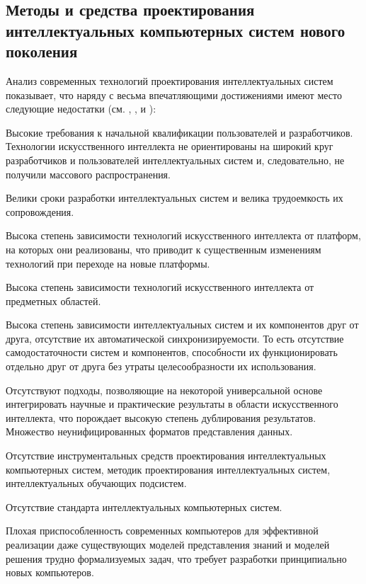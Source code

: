 
\begin{partbacktext}
\part{Методы и средства проектирования интеллектуальных компьютерных систем нового поколения}
\noindent
Анализ современных технологий проектирования интеллектуальных систем показывает, что
наряду с весьма впечатляющими достижениями имеют место следующие недостатки (см. , ,  и ):
\begin{textitemize}
	\item{Высокие требования к начальной квалификации пользователей и разработчиков. Технологии искусственного интеллекта не ориентированы на широкий круг разработчиков и пользователей интеллектуальных систем и, следовательно, не получили массового распространения.}
	\item{Велики сроки разработки интеллектуальных систем и велика трудоемкость их сопровождения.}
	\item{Высока степень зависимости технологий искусственного интеллекта от платформ, на которых они реализованы, что приводит к существенным изменениям технологий при переходе на новые платформы.}
	\item{Высока степень зависимости технологий искусственного интеллекта от предметных областей.}
	\item{Высока степень зависимости интеллектуальных систем и их компонентов друг от друга, отсутствие их автоматической синхронизируемости. То есть отсутствие самодостаточности систем и компонентов, способности их функционировать отдельно друг от друга без утраты целесообразности их использования.}
	\item{Отсутствуют подходы, позволяющие на некоторой универсальной основе интегрировать научные и практические результаты в области искусственного интеллекта, что порождает высокую степень дублирования результатов. Множество неунифицированных форматов представления данных.}
	\item{Отсутствие инструментальных средств проектирования интеллектуальных компьютерных систем, методик проектирования интеллектуальных систем, интеллектуальных обучающих подсистем.}
	\item{Отсутствие стандарта интеллектуальных компьютерных систем.}
	\item{Плохая приспособленность современных компьютеров для эффективной реализации даже существующих моделей представления знаний и моделей решения трудно формализуемых задач, что требует разработки принципиально новых компьютеров.}
\end{textitemize}


\end{partbacktext}
